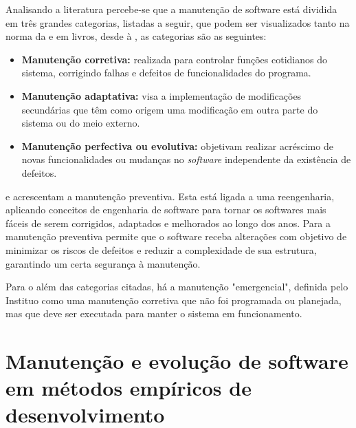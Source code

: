 
Analisando a literatura percebe-se que a manutenção de software está dividida em três grandes categorias, listadas a seguir, que podem ser visualizados tanto na norma da \cite{ieee1219} e em livros, desde \cite{lientz1980software} à \cite{pfleeger2004engenharia}, as categorias são as seguintes:
\begin{itemize}
\item \textbf{Manutenção corretiva:} realizada para controlar funções cotidianos do sistema, corrigindo falhas e defeitos de funcionalidades do programa.

\item \textbf{Manutenção adaptativa:} visa a implementação de modificações secundárias que têm como origem uma modificação em outra parte do sistema ou do meio externo.

\item \textbf{Manutenção perfectiva ou evolutiva:} objetivam realizar acréscimo de novas funcionalidades ou mudanças no \textit{software} independente da existência de defeitos.
\end{itemize}

 e  acrescentam a manutenção preventiva. Esta está ligada a uma reengenharia, aplicando conceitos de engenharia de software para tornar os softwares mais fáceis de serem corrigidos, adaptados e melhorados ao longo dos anos. Para  a manutenção preventiva permite que o software receba alterações com objetivo de minimizar os riscos de defeitos e reduzir a complexidade de sua estrutura, garantindo um certa segurança à manutenção.


Para o  além das categorias citadas, há a manutenção "emergencial", definida pelo Instituo como uma manutenção corretiva que não foi programada ou planejada, mas que deve ser executada para manter o sistema em funcionamento.


\section{Manutenção e evolução de software em métodos empíricos de desenvolvimento}

